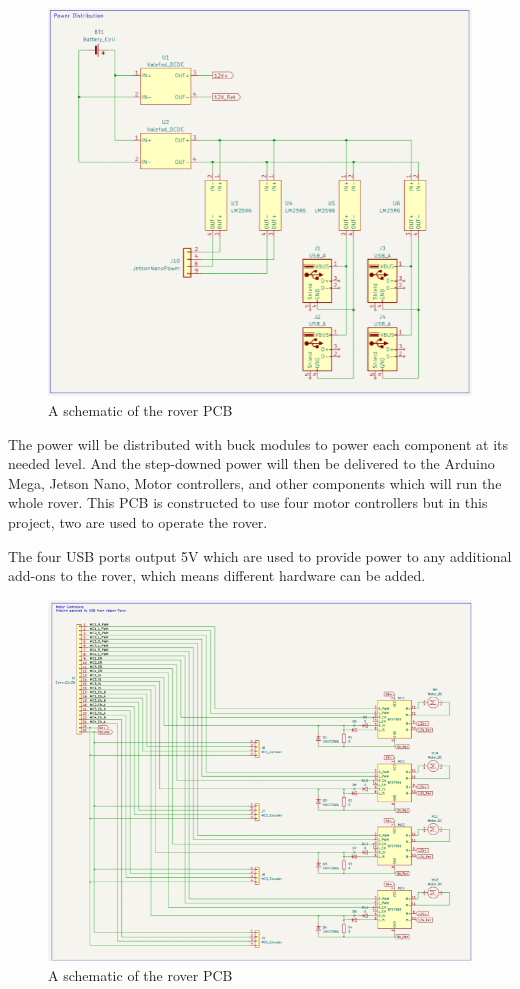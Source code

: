 \documentclass[a4paper, 10pt]{article}
\begin{document}
		\begin{figure} [!h]
			\centering
			\includegraphics[scale=0.9]{Photos/Rover schematic 1}
			\caption{A schematic of the rover PCB}
			\label{rover_PCB_1}
		\end{figure}

		The power will be distributed with buck modules to power each component at its needed level. And the step-downed power will then be delivered to the Arduino Mega, Jetson Nano, Motor controllers, and other components which will run the whole rover. This PCB is constructed to use four motor controllers but in this project, two are used to operate the rover. 
		
		The four USB ports output 5V which are used to provide power to any additional add-ons to the rover, which means different hardware can be added. 
		
		\begin{figure} [!h]
			\centering
			\includegraphics[scale=0.9]{Photos/Rover schematic 2}
			\caption{A schematic of the rover PCB}
			\label{rover_PCB_2}
		\end{figure}
		
\end{document}
